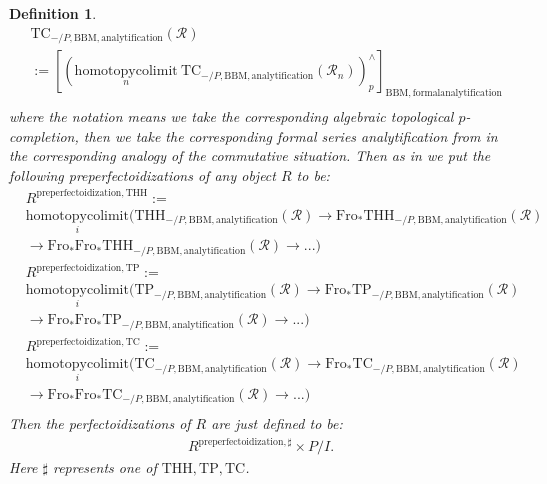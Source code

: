 \documentclass[12pt]{book}
\newtheorem{definition}{Definition}
\begin{document}
\begin{definition}
\begin{align}
& \mathrm{TC}_{-/P,\mathrm{BBM},\mathrm{analytification}}(\mathcal{R})\\
&:=[(\underset{n}{\mathrm{homotopycolimit}}~  \mathrm{TC}_{-/P,\mathrm{BBM},\mathrm{analytification}}(\mathcal{R}_n))^\wedge_{p}]_{\mathrm{BBM},\mathrm{formalanalytification}}\\	
\end{align}
where the notation means we take the corresponding algebraic topological $p$-completion, then we take the corresponding formal series analytification from \cite[4.2]{BBM} in the corresponding analogy of the commutative situation. Then as in \cite[Definition 8.2]{BS} we put the following preperfectoidizations of any object $R$ to be:
\begin{align}
&R^\mathrm{preperfectoidization,THH}:=\\
&\underset{i}{\mathrm{homotopycolimit}}(\mathrm{THH}_{-/P,\mathrm{BBM},\mathrm{analytification}}(\mathcal{R})\rightarrow \mathrm{Fro}_*\mathrm{THH}_{-/P,\mathrm{BBM},\mathrm{analytification}}(\mathcal{R})\\
&\rightarrow \mathrm{Fro}_*\mathrm{Fro}_*\mathrm{THH}_{-/P,\mathrm{BBM},\mathrm{analytification}}(\mathcal{R})\rightarrow...)	\\
&R^\mathrm{preperfectoidization,TP}:=\\
&\underset{i}{\mathrm{homotopycolimit}}(\mathrm{TP}_{-/P,\mathrm{BBM},\mathrm{analytification}}(\mathcal{R})\rightarrow \mathrm{Fro}_*\mathrm{TP}_{-/P,\mathrm{BBM},\mathrm{analytification}}(\mathcal{R})\\
&\rightarrow \mathrm{Fro}_*\mathrm{Fro}_*\mathrm{TP}_{-/P,\mathrm{BBM},\mathrm{analytification}}(\mathcal{R})\rightarrow...)	\\
&R^\mathrm{preperfectoidization,TC}:=\\
&\underset{i}{\mathrm{homotopycolimit}}(\mathrm{TC}_{-/P,\mathrm{BBM},\mathrm{analytification}}(\mathcal{R})\rightarrow \mathrm{Fro}_*\mathrm{TC}_{-/P,\mathrm{BBM},\mathrm{analytification}}(\mathcal{R})\\
&\rightarrow \mathrm{Fro}_*\mathrm{Fro}_*\mathrm{TC}_{-/P,\mathrm{BBM},\mathrm{analytification}}(\mathcal{R})\rightarrow...)	\\
\end{align}
Then the perfectoidizations of $R$ are just defined to be:
\begin{align}
R^\mathrm{preperfectoidization,\sharp}\times P/I.	
\end{align}
Here $\sharp$ represents one of $\mathrm{THH},\mathrm{TP},\mathrm{TC}$.
\end{definition}
\end{document}
